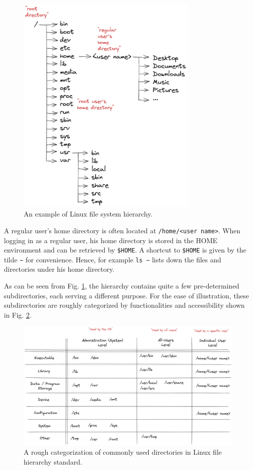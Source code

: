 \begin{figure}[htbp]
	\centering
	\includegraphics[width=250pt]{chapters/part-1/figures/linux_file_hierarchy.png}
	\caption{An example of Linux file system hierarchy.} \label{ch:fm:fig:hierarchy}
\end{figure}

A regular user's home directory is often located at \verb|/home/<user name>|. When logging in as a regular user, his home directory is stored in the HOME environment and can be retrieved by \verb|$HOME|. A shortcut to \verb|$HOME| is given by the tilde \verb|~| for convenience. Hence, for example \verb|ls ~| lists down the files and directories under his home directory.

As can be seen from Fig. \ref{ch:fm:fig:hierarchy}, the hierarchy contains quite a few pre-determined subdirectories, each serving a different purpose. For the ease of illustration, these subdirectories are roughly categorized by functionalities and accessibility shown in Fig. \ref{ch:fm:fig:directorycate}.

\begin{figure}[htbp]
	\centering
	\includegraphics[width=350pt]{chapters/part-1/figures/linux_directory_cate.png}
	\caption{A rough categorization of commonly used directories in Linux file hierarchy standard.} \label{ch:fm:fig:directorycate}
\end{figure}

